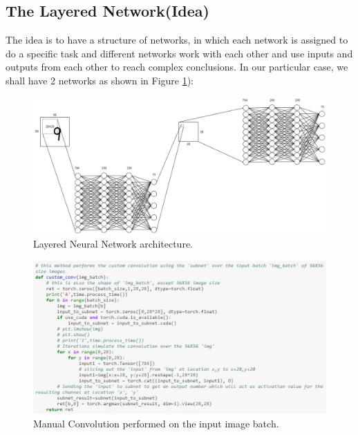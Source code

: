 \documentclass[12pt]{acmart}
\begin{document}
\subsection{The Layered Network(Idea)}
The idea is to have a structure of networks, in which each network is assigned to do a specific task and different networks work with each other and use inputs and outputs from each other to reach complex conclusions.
In our particular case, we shall have 2 networks as shown in Figure \ref{fig:Layered Convolution}):
\begin{figure}[H]
  \includegraphics[width=\linewidth]{Layered-Convolution.jpg}
  \caption{Layered Neural Network architecture.}
  \label{fig:Layered Convolution}
\end{figure}
\begin{figure}[H]
  \includegraphics[width=\linewidth]{Custom_Conv.JPG}
  \caption{Manual Convolution performed on the input image batch.}
  \label{fig:Custom_Conv}
\end{figure}
\end{document}
